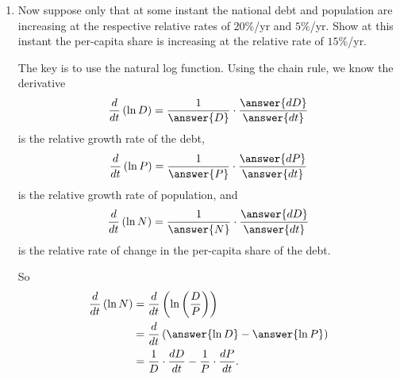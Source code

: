\documentclass{ximera}
\begin{document}
\begin{question}
\begin{enumerate}
\begin{enumerate}
Since 
\begin{align*}
 N &=h(t)  \\
    &= \frac{f(t)}{g(t)} \\
   &= \frac{D_0 e^{0.20t}}{P_0 e^{0.05t}} \\
   &= N_0 e^{\answer{0.15t}} ,
\end{align*}

\begin{align*}
 \frac{1}{N} \cdot \frac{dN}{dt} &= \frac{1}{N}\cdot \frac{d}{dt} \left( N_0 e^{\answer{0.15t}} \right) \\
                                               &= \frac{1}{N_0 e^{0.15t}}\cdot N_0 \left( \answer{0.15e^{0.15t}} \right) \\
                                               &= \answer{0.15} .
\end{align*}

\item State a clear conclusion. What can you say about the relative rate of change in the per-capita share of the national debt if the debt and population are increasing at the respective relative instantaneous rate of $20\%$/year and $5\%$/year, each assumed to be constant?
\begin{freeResponse}
\end{freeResponse}

\end{enumerate}

\item Now suppose only that at some instant the national debt and population are increasing at the respective relative rates of $20\%$/yr and $5\%$/yr. Show at this instant the per-capita share is increasing at the relative rate of $15\%$/yr. 

The key is to use the natural log function. Using the chain rule, we know the derivative
\[
      \frac{d}{dt} \left( \ln D  \right) = \frac{1}{\answer{D}} \cdot \frac{\answer{dD}}{\answer{dt}}
\]
is the relative growth rate of the debt,
\[
        \frac{d}{dt} \left( \ln P  \right) = \frac{1}{\answer{P}} \cdot \frac{\answer{dP}}{\answer{dt}}
\]
is the relative growth rate of population, and
\[
      \frac{d}{dt} \left( \ln N  \right) = \frac{1}{\answer{N}} \cdot \frac{\answer{dD}}{\answer{dt}}
\]
is the relative rate of change in the per-capita share of the debt.

So
\begin{align*}
      \frac{d}{dt} \left( \ln N  \right) &= \frac{d}{dt} \left( \ln \left( \frac{D}{P}  \right)  \right) \\
                                                   &=\frac{d}{dt} \left( \answer{\ln D} - \answer{\ln P} \right)\\
                                                   &=\frac{1}{D}\cdot \frac{dD}{dt} - \frac{1}{P} \cdot \frac{dP}{dt}.
\end{align*}


\end{enumerate}
\end{question}
\end{document}
